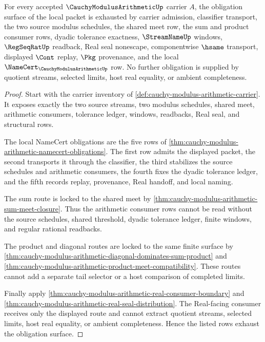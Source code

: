 \begin{theorem}
\label{thm:cauchy-modulus-arithmetic-obligation-closure}
For every accepted $\CauchyModulusArithmeticUp$ carrier $A$, the obligation surface of the local packet is exhausted by carrier admission, classifier transport, the two source modulus schedules, the shared meet row, the sum and product consumer rows, dyadic tolerance exactness, $\StreamNameUp$ windows, $\RegSeqRatUp$ readback, Real seal nonescape, componentwise $\hsame$ transport, displayed $\Cont$ replay, $\Pkg$ provenance, and the local $\NameCert_{\CauchyModulusArithmeticUp}$ row. No further obligation is supplied by quotient streams, selected limits, host real equality, or ambient completeness.
\end{theorem}
\begin{proof}
Start with the carrier inventory of \autoref{def:cauchy-modulus-arithmetic-carrier}. It exposes exactly the two source streams, two modulus schedules, shared meet, arithmetic consumers, tolerance ledger, windows, readbacks, Real seal, and structural rows.

The local NameCert obligations are the five rows of \autoref{thm:cauchy-modulus-arithmetic-namecert-obligations}. The first row admits the displayed packet, the second transports it through the classifier, the third stabilizes the source schedules and arithmetic consumers, the fourth fixes the dyadic tolerance ledger, and the fifth records replay, provenance, Real handoff, and local naming.

The sum route is locked to the shared meet by \autoref{thm:cauchy-modulus-arithmetic-sum-meet-closure}. Thus the arithmetic consumer rows cannot be read without the source schedules, shared threshold, dyadic tolerance ledger, finite windows, and regular rational readbacks.

The product and diagonal routes are locked to the same finite surface by
\autoref{thm:cauchy-modulus-arithmetic-diagonal-dominates-sum-product} and
\autoref{thm:cauchy-modulus-arithmetic-product-meet-compatibility}. These
routes cannot add a separate tail selector or a host comparison of completed
limits.

Finally apply \autoref{thm:cauchy-modulus-arithmetic-real-consumer-boundary}
and \autoref{thm:cauchy-modulus-arithmetic-real-seal-distribution}. The
Real-facing consumer receives only the displayed route and cannot extract
quotient streams, selected limits, host real equality, or ambient completeness.
Hence the listed rows exhaust the obligation surface.
\end{proof}

